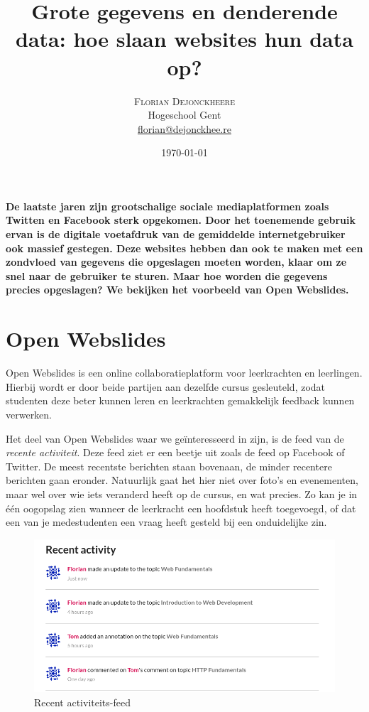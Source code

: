 \documentclass[twoside,twocolumn]{article}
\title{Grote gegevens en denderende data: hoe slaan websites hun data op?} %
\author{%
\textsc{Florian Dejonckheere} \\[1ex] %
\normalsize Hogeschool Gent \\ %
\normalsize \href{mailto:florian@dejonckhee.re}{florian@dejonckhee.re} %
}
\date{\today} %
\begin{document}
\maketitle



\textbf{De laatste jaren zijn grootschalige sociale mediaplatformen zoals Twitten en Facebook sterk opgekomen.
  Door het toenemende gebruik ervan is de digitale voetafdruk van de gemiddelde internetgebruiker ook massief gestegen.
  Deze websites hebben dan ook te maken met een zondvloed van gegevens die opgeslagen moeten worden, klaar om ze snel naar de gebruiker te sturen.
  Maar hoe worden die gegevens precies opgeslagen? We bekijken het voorbeeld van Open Webslides.}\\

\section*{Open Webslides}

Open Webslides is een online collaboratieplatform voor leerkrachten en leerlingen.
Hierbij wordt er door beide partijen aan dezelfde cursus gesleuteld, zodat studenten deze beter kunnen leren en leerkrachten gemakkelijk feedback kunnen verwerken.

Het deel van Open Webslides waar we ge\"{i}nteresseerd in zijn, is de feed van de \textit{recente activiteit}.
Deze feed ziet er een beetje uit zoals de feed op Facebook of Twitter.
De meest recentste berichten staan bovenaan, de minder recentere berichten gaan eronder.
Natuurlijk gaat het hier niet over foto's en evenementen, maar wel over wie iets veranderd heeft op de cursus, en wat precies.
Zo kan je in \'{e}\'{e}n oogopslag zien wanneer de leerkracht een hoofdstuk heeft toegevoegd, of dat een van je medestudenten een vraag heeft gesteld bij een onduidelijke zin.


\begin{figure}
  \centering
  \includegraphics[width=.8\textwidth]{recent-activity.png}
  \caption{Recent activiteits-feed}
  \label{fig:graph-model}
\end{figure}
\end{document}
